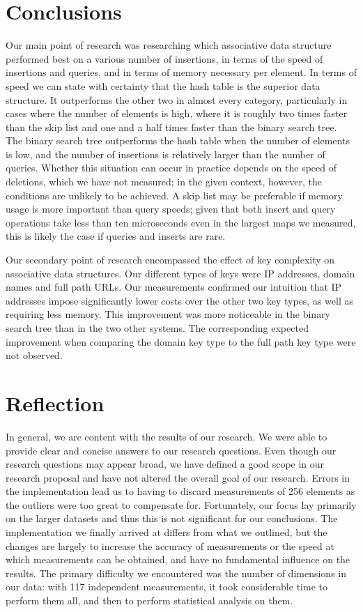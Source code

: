 \documentclass[12pt,a4paper]{article}
\begin{document}
    \section{Conclusions}
    Our main point of research was researching which associative data structure performed best on a
    various number of insertions, in terms of the speed of insertions and queries, and in terms of
    memory necessary per element.  In terms of speed we can state with certainty that the hash table
    is the superior data structure.  It outperforms the other two in almost every category,
    particularly in cases where the number of elements is high, where it is roughly two times faster
    than the skip list and one and a half times faster than the binary search tree.  The binary
    search tree outperforms the hash table when the number of elements is low, and the number of
    insertions is relatively larger than the number of queries.  Whether this situation can occur in
    practice depends on the speed of deletions, which we have not measured; in the given context,
    however, the conditions are unlikely to be achieved.  A skip list may be preferable if memory
    usage is more important than query speeds; given that both insert and query operations take less
    than ten microseconds even in the largest maps we measured, this is likely the case if queries
    and inserts are rare.

    Our secondary point of research encompassed the effect of key complexity on associative data
    structures.  Our different types of keys were IP addresses, domain names and full path URLs.  Our
    measurements confirmed our intuition that IP addresses impose significantly lower costs over the
    other two key types, as well as requiring less memory.  This improvement was more noticeable in
    the binary search tree than in the two other systems.  The corresponding expected improvement
    when comparing the domain key type to the full path key type were not observed.


    \section{Reflection}
    In general, we are content with the results of our research. We were able to provide clear and
    concise answers to our research questions. Even though our research questions may appear broad,
    we have defined a good scope in our research proposal and have not altered the overall goal
    of our research.  Errors in the implementation lead us to having to discard measurements of 256
    elements as the outliers were too great to compensate for.  Fortunately, our focus lay primarily
    on the larger datasets and thus this is not significant for our conclusions.  The implementation
    we finally arrived at differs from what we outlined, but the changes are largely to increase the
    accuracy of measurements or the speed at which measurements can be obtained, and have no
    fundamental influence on the results.  The primary difficulty we encountered was the number of
    dimensions in our data: with 117 independent measurements, it took considerable time to perform
    them all, and then to perform statistical analysis on them.
\end{document}
